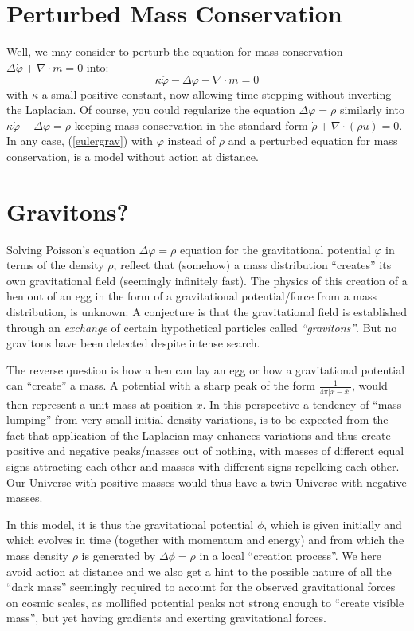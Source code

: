 \section{Perturbed Mass Conservation} 

Well, we may consider
to perturb the equation for mass conservation
$\Delta\dot\varphi +\nabla\cdot m=0$ into: 
\[
\kappa\ddot\varphi -  \Delta\dot\varphi -\nabla\cdot m=0
\]
with $\kappa$ a small positive constant, now allowing time stepping
without inverting the Laplacian. Of course, you could regularize the
equation $\Delta\varphi =\rho$ similarly into  
$\kappa\dot\varphi -\Delta\varphi =\rho$ keeping mass conservation in the
standard form $\dot\rho +\nabla\cdot (\rho u)=0$. In any case,
(\ref{eulergrav}) with $\varphi$ instead of $\rho$ and a perturbed
equation for mass conservation, is a model without action at distance.


\section{Gravitons?}

Solving Poisson's equation $\Delta\varphi =\rho$
equation for the gravitational
potential $\varphi$ in terms of the density $\rho$, reflect that
(somehow) a mass distribution ``creates'' its own gravitational field
(seemingly infinitely fast). The physics of this creation of a hen out
of an egg in the form of
a gravitational potential/force from a mass distribution, is unknown: A
conjecture is that the gravitational field is 
established through an \emph{exchange} of certain hypothetical particles 
called \emph{``gravitons''}. But no gravitons have been detected despite
intense search.



The reverse question is how a hen can lay an egg 
or how a gravitational potential can ``create'' a mass.
A potential with a sharp peak of the form 
$\frac{1}{4\pi\vert x-\bar x\vert}$, would then represent a
unit mass at position $\bar x$.  
In this perspective a tendency of ``mass lumping'' from 
very small initial density
variations, is to be expected from the fact that application of the Laplacian
may enhances variations and thus create positive and negative peaks/masses
out of nothing, with masses of different equal signs attracting each other
and masses with different signs repelleing each other. Our Universe
with positive masses would thus have a twin Universe with negative masses.

In this model, it is thus the gravitational 
potential $\phi$, which is given initially
and which evolves in time (together with momentum and energy)
and from which the mass density $\rho$ is generated by $\Delta\phi =\rho$
in a local ``creation process''.
We here avoid action at distance and we also get a hint
to the possible nature of all the ``dark mass'' seemingly required to account 
for the observed gravitational forces on cosmic scales, as 
mollified potential peaks not strong enough to 
``create visible mass'', but yet having gradients and exerting
gravitational forces.

